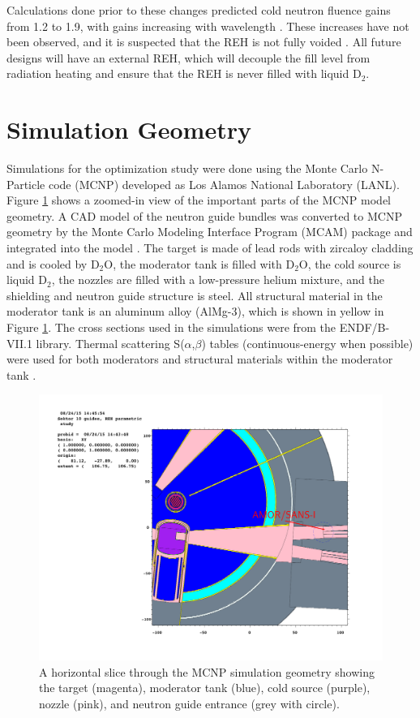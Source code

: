 \documentclass[preprint,12pt]{elsarticle}
\begin{document}
Calculations done prior to these changes predicted cold neutron fluence gains from 1.2 to 1.9, with gains increasing with wavelength \cite{atch_icans}. These increases have not been observed, and it is suspected that the REH is not fully voided \cite{voided}.  All future designs will have an external REH, which will decouple the fill level from radiation heating and ensure that the REH is never filled with liquid D$_2$.

\section{Simulation Geometry}

Simulations for the optimization study were done using the Monte Carlo N-Particle code (MCNP) developed as Los Alamos National Laboratory (LANL).  Figure \ref{geom} shows a zoomed-in view of the important parts of the MCNP model geometry.  A CAD model of the neutron guide bundles was converted to MCNP geometry by the Monte Carlo Modeling Interface Program (MCAM) package and integrated into the model \cite{mcam}.  The target is made of lead rods with zircaloy cladding and is cooled by D$_2$O, the moderator tank is filled with D$_2$O, the cold source is liquid D$_2$, the nozzles are filled with a low-pressure helium mixture, and the shielding and neutron guide structure is steel.  All structural material in the moderator tank is an aluminum alloy (AlMg-3), which is shown in yellow in Figure \ref{geom}.  The cross sections used in the simulations were from the ENDF/B-VII.1 library.  Thermal scattering S($\alpha$,$\beta$) tables (continuous-energy when possible) were used for both moderators and structural materials within the moderator tank \cite{sab}.

\begin{figure}[h!]
\begin{center}
\includegraphics[trim={9.2cm 8cm 4cm 8cm},clip]{graphics/geom2.pdf}
\end{center}
\caption{\label{geom}A horizontal slice through the MCNP simulation geometry showing the target (magenta), moderator tank (blue), cold source (purple), nozzle (pink), and neutron guide entrance (grey with circle).}
\end{figure}
\end{document}
